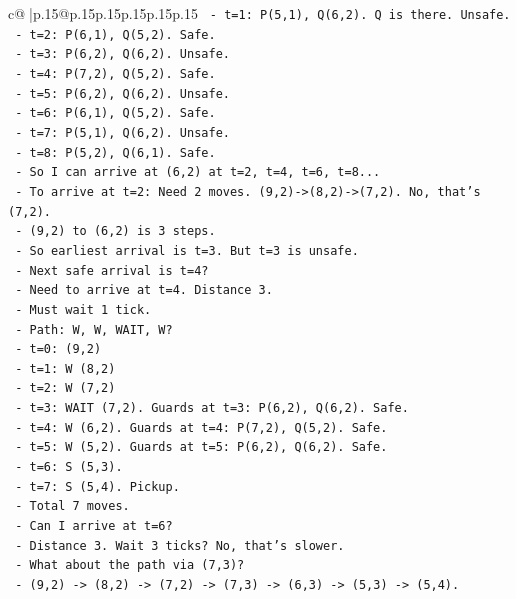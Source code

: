\documentclass{article}
\begin{document}
{\begin{supertabular}{c@{$\;$}|p{.15\linewidth}@{}p{.15\linewidth}p{.15\linewidth}p{.15\linewidth}p{.15\linewidth}p{.15\linewidth}}
{{{\texttt{      {-} t=1: P(5,1), Q(6,2). Q is there. Unsafe.} \\
\texttt{      {-} t=2: P(6,1), Q(5,2). Safe.} \\
\texttt{      {-} t=3: P(6,2), Q(6,2). Unsafe.} \\
\texttt{      {-} t=4: P(7,2), Q(5,2). Safe.} \\
\texttt{      {-} t=5: P(6,2), Q(6,2). Unsafe.} \\
\texttt{      {-} t=6: P(6,1), Q(5,2). Safe.} \\
\texttt{      {-} t=7: P(5,1), Q(6,2). Unsafe.} \\
\texttt{      {-} t=8: P(5,2), Q(6,1). Safe.} \\
\texttt{    {-} So I can arrive at (6,2) at t=2, t=4, t=6, t=8...} \\
\texttt{    {-} To arrive at t=2: Need 2 moves. (9,2){-}>(8,2){-}>(7,2). No, that's (7,2).} \\
\texttt{    {-} (9,2) to (6,2) is 3 steps.} \\
\texttt{    {-} So earliest arrival is t=3. But t=3 is unsafe.} \\
\texttt{    {-} Next safe arrival is t=4?} \\
\texttt{      {-} Need to arrive at t=4. Distance 3.} \\
\texttt{      {-} Must wait 1 tick.} \\
\texttt{      {-} Path: W, W, WAIT, W?} \\
\texttt{      {-} t=0: (9,2)} \\
\texttt{      {-} t=1: W (8,2)} \\
\texttt{      {-} t=2: W (7,2)} \\
\texttt{      {-} t=3: WAIT (7,2). Guards at t=3: P(6,2), Q(6,2). Safe.} \\
\texttt{      {-} t=4: W (6,2). Guards at t=4: P(7,2), Q(5,2). Safe.} \\
\texttt{      {-} t=5: W (5,2). Guards at t=5: P(6,2), Q(6,2). Safe.} \\
\texttt{      {-} t=6: S (5,3).} \\
\texttt{      {-} t=7: S (5,4). Pickup.} \\
\texttt{      {-} Total 7 moves.} \\
\texttt{    {-} Can I arrive at t=6?} \\
\texttt{      {-} Distance 3. Wait 3 ticks? No, that's slower.} \\
\texttt{    {-} What about the path via (7,3)?} \\
\texttt{      {-} (9,2) {-}> (8,2) {-}> (7,2) {-}> (7,3) {-}> (6,3) {-}> (5,3) {-}> (5,4).} \\
}}}
\end{supertabular}}
\end{document}
